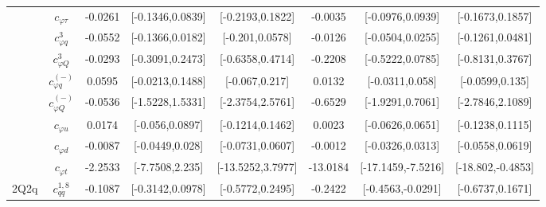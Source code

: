 \documentclass{article}
\begin{document}
\begin{table}[H]
\begin{tabular}{|c|c|c|c|c|c|c|c|}
 & $c_{\varphi \tau}$ & -0.0261                             & [-0.1346,0.0839]                                 & [-0.2193,0.1822] & -0.0035                             & [-0.0976,0.0939]                                 & [-0.1673,0.1857] \\ \cline{2-8}
 & $c_{\varphi q}^{3}$ & -0.0552                             & [-0.1366,0.0182]                                 & [-0.201,0.0578] & -0.0126                             & [-0.0504,0.0255]                                 & [-0.1261,0.0481] \\ \cline{2-8}
 & $c_{\varphi Q}^{3}$ & -0.0293                             & [-0.3091,0.2473]                                 & [-0.6358,0.4714] & -0.2208                             & [-0.5222,0.0785]                                 & [-0.8131,0.3767] \\ \cline{2-8}
 & $c_{\varphi q}^{(-)}$ & 0.0595                             & [-0.0213,0.1488]                                 & [-0.067,0.217] & 0.0132                             & [-0.0311,0.058]                                 & [-0.0599,0.135] \\ \cline{2-8}
 & $c_{\varphi Q}^{(-)}$ & -0.0536                             & [-1.5228,1.5331]                                 & [-2.3754,2.5761] & -0.6529                             & [-1.9291,0.7061]                                 & [-2.7846,2.1089] \\ \cline{2-8}
 & $c_{\varphi u}$ & 0.0174                             & [-0.056,0.0897]                                 & [-0.1214,0.1462] & 0.0023                             & [-0.0626,0.0651]                                 & [-0.1238,0.1115] \\ \cline{2-8}
 & $c_{\varphi d}$ & -0.0087                             & [-0.0449,0.028]                                 & [-0.0731,0.0607] & -0.0012                             & [-0.0326,0.0313]                                 & [-0.0558,0.0619] \\ \cline{2-8}
 & $c_{\varphi t}$ & -2.2533                             & [-7.7508,2.235]                                 & [-13.5252,3.7977] & -13.0184                             & [-17.1459,-7.5216]                                 & [-18.802,-0.4853] \\ \cline{2-8}
\hline
\multirow{14}{*}{2Q2q}
 & $c_{qq}^{1,8}$ & -0.1087                             & [-0.3142,0.0978]                                 & [-0.5772,0.2495] & -0.2422                             & [-0.4563,-0.0291]                                 & [-0.6737,0.1671] \\ \cline{2-8}

\end{tabular}
\end{table}
\end{document}
